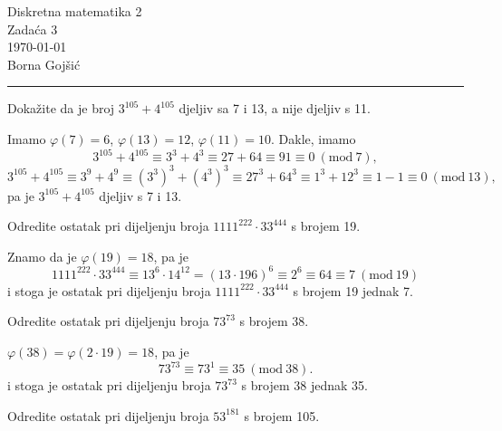 \documentclass{exam}
\newcommand{\Mod}[1]{\ (\mathrm{mod}\ #1)}
\def \brojZadace {3}
\begin{document}
\begingroup
\centering
\LARGE Diskretna matematika 2\\
\Large Zadaća \brojZadace\\
\large \today\\
\large Borna Gojšić\par
\endgroup
\rule{\textwidth}{0.4pt}
\pointsdroppedatright   %
\printanswers
\renewcommand{\solutiontitle}{\noindent\textbf{Rj:}\enspace}   %

\begin{questions}

\question Dokažite da je broj $3^{105} + 4^{105}$ djeljiv sa 7 i 13, a nije djeljiv s 11.

\begin{solution}
  Imamo $\varphi(7) = 6$, $\varphi(13) = 12$, $\varphi(11) = 10$.
  Dakle, imamo
  \[
    3^{105} + 4^{105} \equiv 3^3 + 4^3 \equiv 27 + 64 \equiv 91 \equiv 0 \Mod{7},
  \]
  \[
    3^{105} + 4^{105} \equiv 3^9 + 4^9 \equiv (3^3)^3 + (4^3)^3 \equiv 27^3 + 64^3 \equiv 1^3 + 12^3 \equiv 1 - 1 \equiv 0 \Mod{13},
  \]
  pa je $3^{105} + 4^{105}$ djeljiv s 7 i 13.
\end{solution}

\question Odredite ostatak pri dijeljenju broja $1111^{222} \cdot 33^{444}$ s brojem 19.

\begin{solution}
  Znamo da je $\varphi(19) = 18$, pa je
  \[
    1111^{222} \cdot 33^{444} \equiv 13^6 \cdot 14^{12} = (13 \cdot 196)^6 \equiv 2^6 \equiv 64 \equiv 7 \Mod{19}
  \]
  i stoga je ostatak pri dijeljenju broja $1111^{222} \cdot 33^{444}$ s brojem 19 jednak 7.
\end{solution}

\question Odredite ostatak pri dijeljenju broja $73^{73}$ s brojem 38.

\begin{solution}
  $\varphi(38) = \varphi(2 \cdot 19) = 18$, pa je
  \[
    73^{73} \equiv 73^1 \equiv 35 \Mod{38}.
  \]
  i stoga je ostatak pri dijeljenju broja $73^{73}$ s brojem 38 jednak 35.
\end{solution}

\question Odredite ostatak pri dijeljenju broja $53^{181}$ s brojem 105.


\end{questions}
\end{document}
